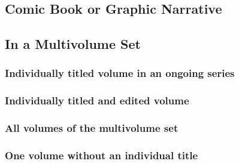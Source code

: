\documentclass{article}
\begin{document}
\subsection{Comic Book or Graphic Narrative} %
\label{ssub:comic_book_or_graphic_narrative}
\begin{refsection}
	\nocite{Clowes:1998wp,Waid:2005up}
	\printbibliography[heading=none]
\end{refsection}
\subsection{In a Multivolume Set} %
\label{sub:in_a_multivolume_set}
\subsubsection{Individually titled volume in an ongoing series} %
\label{ssub:individually_titled_volume_in_an_ongoing_series}
\begin{refsection}
	\nocite{Caro:2012wy}
	\printbibliography[heading=none]
\end{refsection}
\subsubsection{Individually titled and edited volume} %
\label{ssub:individually_titled_and_edited_volume}
\begin{refsection}
	\nocite{Howells:1968wo}
	\printbibliography[heading=none]
\end{refsection}
\subsubsection{All volumes of the multivolume set} %
\label{ssub:all_volumes_of_the_multivolume_set}
\begin{refsection}
	\nocite{Rampersad:2002va}
	\printbibliography[heading=none]
\end{refsection}
\subsubsection{One volume without an individual title} %
\label{ssub:one_volume_without_an_individual_title}
\begin{refsection}
	\nocite{Wellek:1992ws}
	\printbibliography[heading=none]
\end{refsection}
\end{document}
